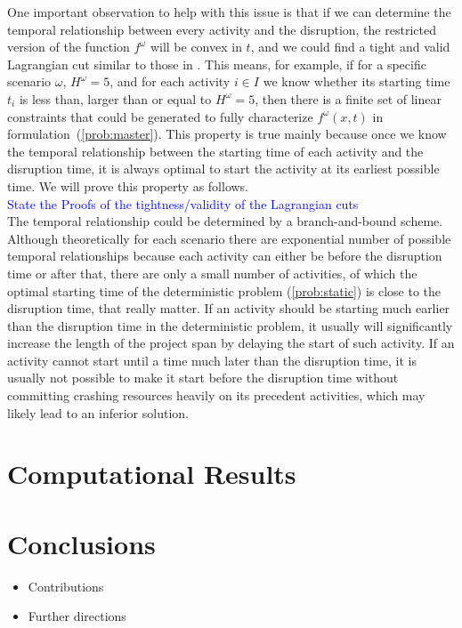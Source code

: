 \documentclass[11pt]{article}
\begin{document}
	One important observation to help with this issue is that if we can determine the temporal relationship between every activity and the disruption, the restricted version of the function \(f^\omega\) will be convex in \(t\), and we could find a tight and valid Lagrangian cut similar to those in \cite{zou2016nested}. This means, for example, if for a specific scenario \(\omega\), \(H^\omega = 5\), and for each activity \(i \in I\) we know whether its starting time \(t_i\) is less than, larger than or equal to \(H^\omega = 5\), then there is a finite set of linear constraints that could be generated to fully characterize \(f^\omega(x,t)\) in formulation~(\ref{prob:master}). This property is true mainly because once we know the temporal relationship between the starting time of each activity and the disruption time, it is always optimal to start the activity at its earliest possible time. We will prove this property as follows. \\
	\newline
	\textcolor{blue}{State the Proofs of the tightness/validity of the Lagrangian cuts}\\
	\newline
	The temporal relationship could be determined by a branch-and-bound scheme. Although theoretically for each scenario there are exponential number of possible temporal relationships because each activity can either be before the disruption time or after that, there are only a small number of activities, of which the optimal starting time of the deterministic problem (\ref{prob:static}) is close to the disruption time, that really matter. If an activity should be starting much earlier than the disruption time in the deterministic problem, it usually will significantly increase the length of the project span by delaying the start of such activity. If an activity cannot start until a time much later than the disruption time, it is usually not possible to make it start before the disruption time without committing crashing resources heavily on its precedent activities, which may likely lead to an inferior solution.

\section{Computational Results} \label{sec:results}

\section{Conclusions} \label{sec:conclusions}
	\begin{itemize}
		\item Contributions
		\item Further directions
	\end{itemize}



\end{document}
